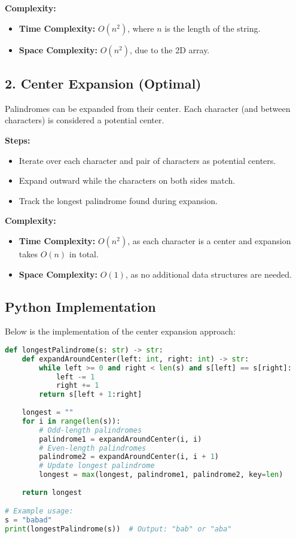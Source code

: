 \textbf{Complexity:}
\begin{itemize}
    \item \textbf{Time Complexity:} \(O(n^2)\), where \(n\) is the length of the string.
    \item \textbf{Space Complexity:} \(O(n^2)\), due to the 2D array.
\end{itemize}

\subsection*{2. Center Expansion (Optimal)}
Palindromes can be expanded from their center. Each character (and between characters) is considered a potential center.

\textbf{Steps:}
\begin{itemize}
    \item Iterate over each character and pair of characters as potential centers.
    \item Expand outward while the characters on both sides match.
    \item Track the longest palindrome found during expansion.
\end{itemize}

\textbf{Complexity:}
\begin{itemize}
    \item \textbf{Time Complexity:} \(O(n^2)\), as each character is a center and expansion takes \(O(n)\) in total.
    \item \textbf{Space Complexity:} \(O(1)\), as no additional data structures are needed.
\end{itemize}

\subsection*{Python Implementation}
Below is the implementation of the center expansion approach:

\begin{fullwidth}
\begin{lstlisting}[language=Python]
def longestPalindrome(s: str) -> str:
    def expandAroundCenter(left: int, right: int) -> str:
        while left >= 0 and right < len(s) and s[left] == s[right]:
            left -= 1
            right += 1
        return s[left + 1:right]
    
    longest = ""
    for i in range(len(s)):
        # Odd-length palindromes
        palindrome1 = expandAroundCenter(i, i)
        # Even-length palindromes
        palindrome2 = expandAroundCenter(i, i + 1)
        # Update longest palindrome
        longest = max(longest, palindrome1, palindrome2, key=len)
    
    return longest

# Example usage:
s = "babad"
print(longestPalindrome(s))  # Output: "bab" or "aba"
\end{lstlisting}
\end{fullwidth}

